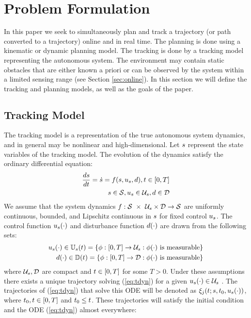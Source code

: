 \section{Problem Formulation \label{sec:formulation}}
In this paper we seek to simultaneously plan and track a trajectory (or path converted to a trajectory) online and in real time. The planning is done using a kinematic or dynamic planning model. The tracking is done by a tracking model representing the autonomous system. The environment may contain static obstacles that are either known a priori or can be observed by the system within a limited sensing range (see Section \ref{sec:online}). In this section we will define the tracking and planning models, as well as the goals of the paper.

\subsection{Tracking Model}
The tracking model is a representation of the true autonomous system dynamics, and in general may be nonlinear and high-dimensional. Let $s$ represent the state variables of the tracking model. The evolution of the dynamics satisfy the ordinary differential equation: 
\begin{equation}
\begin{aligned}
\label{eq:tdyn}
\frac{ds}{dt} = \dot{s} = f(s, u_s, d), t \in [0, T] \\
s \in \mathcal{S}, u_s \in \mathcal{U}_s, d \in \mathcal{D}
\end{aligned}
\end{equation}
We assume that the system dynamics $f : \mathcal{S}\ \times\ \mathcal{U}_s \times \mathcal{D} \rightarrow \mathcal{S}$ are uniformly continuous, bounded, and Lipschitz continuous in $s$ for fixed control $u_s$. The control function $u_s(\cdot)$ and disturbance function $d(\cdot)$ are drawn from the following sets:
\begin{equation}
\begin{aligned}
u_s(\cdot) \in \mathbb{U}_s(t) = \{\phi: [0, T] \rightarrow \mathcal{U}_s: \phi(\cdot) \text{ is measurable}\}\\
d(\cdot) \in \mathbb{D}(t) = \{\phi: [0, T] \rightarrow \mathcal{D}: \phi(\cdot) \text{ is measurable}\}
\end{aligned}
\end{equation}
where $\mathcal{U}_s, \mathcal{D}$ are compact and $t\in[0, T]$ for some $T>0$. Under these assumptions there exists a unique trajectory solving (\ref{eq:tdyn}) for a given $u_s(\cdot) \in \mathcal{U}_s$ \cite{Coddington84}. The trajectories of (\ref{eq:tdyn}) that solve this ODE will be denoted as $\xi_{j}(t; s, t_0, u_s(\cdot))$, where $t_0,t \in [0, T]$ and $t_0 \leq t$. These trajectories will satisfy the initial condition and the ODE (\ref{eq:tdyn}) almost everywhere:
